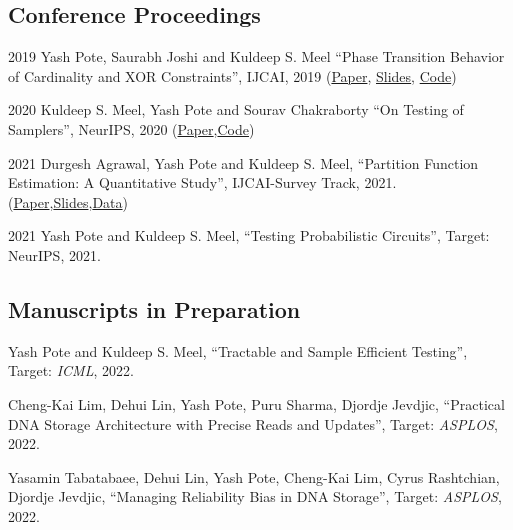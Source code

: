 \documentclass[12pt,letterpaper]{report}
\begin{document}
    \subsection*{Conference Proceedings}

    \begin{tablist}       
        \item[2019] \tab Yash Pote, Saurabh Joshi and Kuldeep S. Meel  \enquote{Phase Transition Behavior of Cardinality and
        XOR Constraints}, IJCAI, 2019 (\href{https://www.ijcai.org/proceedings/2019/0162.pdf}{Paper}, \href{https://meelgroup.github.io/files/slides/ijcai19pjm.pdf}{Slides}, \href{https://github.com/meelgroup/1-CARD-XOR/}{Code})
        
		\item[2020] \tab Kuldeep S. Meel, Yash Pote  and Sourav Chakraborty \enquote{On Testing of Samplers}, NeurIPS, 2020 (\href{https://arxiv.org/abs/2010.12918}{Paper},\href{https://github.com/meelgroup/barbarik}{Code})
		
		\item[2021] \tab  Durgesh Agrawal, Yash Pote  and Kuldeep S. Meel, \enquote{Partition Function Estimation: A Quantitative Study}, IJCAI-Survey Track,  2021.(\href{https://arxiv.org/abs/2105.11132}{Paper},\href{https://meelgroup.github.io/publication/ijcai21_partition}{Slides},\href{t https://doi.org/10.5281/zenodo.
			4769117}{Data})
		
			\item[2021] \tab  Yash Pote  and Kuldeep S. Meel, \enquote{Testing Probabilistic Circuits}, Target: {NeurIPS},  2021.
    \end{tablist}

    \subsection*{Manuscripts in Preparation}

    \begin{tablist}

	

		\item[\the\year] \tab  Yash Pote  and Kuldeep S. Meel, \enquote{Tractable and Sample Efficient Testing}, Target: \textit{ICML},  2022.
		
		\item[\the\year] \tab  Cheng-Kai Lim, Dehui Lin, Yash Pote,  Puru Sharma, Djordje Jevdjic, \enquote{Practical DNA Storage Architecture with Precise Reads and
			Updates}, Target: \textit{ASPLOS},  2022.
		
		\item[\the\year] \tab  Yasamin Tabatabaee,  Dehui Lin, Yash Pote,  Cheng-Kai Lim, Cyrus Rashtchian, Djordje Jevdjic, \enquote{Managing Reliability Bias in DNA Storage}, Target: \textit{ASPLOS},  2022.
		

    \end{tablist}
\end{document}
